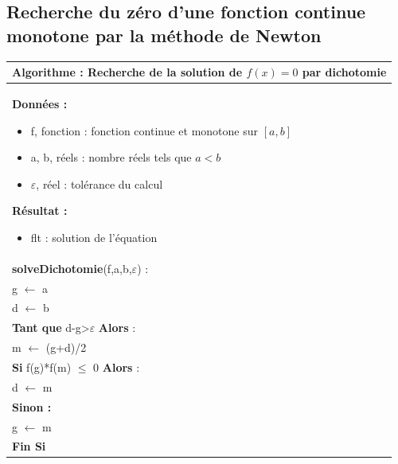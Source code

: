 \documentclass[10pt]{article}
\begin{document}
\subsection{Recherche du zéro d'une fonction continue monotone par la méthode de Newton}


\begin{minipage}[c]{.48\linewidth}
\begin{pseudo}
\begin{center}
\begin{tabular}{p{}}
\hline
\textbf{Algorithme :} Recherche de la solution de $f(x)=0$ par dichotomie \\
\hline
\textbf{Données :}
\begin{itemize}
\item \textsf{f}, fonction : fonction continue et monotone sur $[a,b]$
\item \textsf{a, b}, réels : nombre réels tels que $a<b$
\item \textsf{$\varepsilon$}, réel : tolérance du calcul
\end{itemize}
\textbf{Résultat :} 
\begin{itemize}
\item flt : solution de l'équation
\end{itemize}
\\
\textbf{solveDichotomie}(\textsf{f,a,b,$\varepsilon$}) :\\
\hspace{.4cm}\textsf{g} $\leftarrow$ \textsf{a} \\
\hspace{.4cm}\textsf{d} $\leftarrow$ \textsf{b} \\
\hspace{.4cm}\textbf{Tant que} \textsf{d-g>$\varepsilon$} \textbf{Alors} : \\
\hspace{.8cm}\textsf{m} $\leftarrow$ \textsf{(g+d)/2} \\
\hspace{.8cm}\textbf{Si} \textsf{f(g)*f(m) $\leq$ 0} \textbf{Alors} : \\
\hspace{1.2cm}\textsf{d $\leftarrow$  m} \\
\hspace{.8cm} \textbf{Sinon :} \\
\hspace{1.2cm}\textsf{g $\leftarrow$  m} \\
\hspace{.8cm} \textbf{Fin Si}\\

\end{tabular}
\end{center}
\end{pseudo}
\end{minipage}
\end{document}
